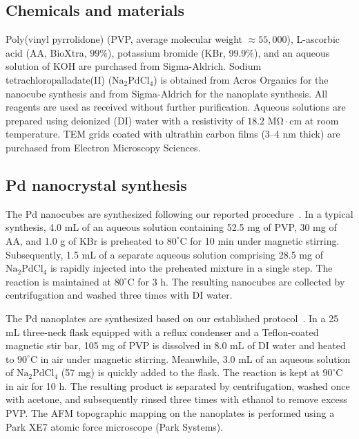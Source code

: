 \documentclass[reprint,amsmath,amssymb,aip,nofootinbib, citeautoscript,]{revtex4-2}
\begin{document}
\subsection*{Chemicals and materials}

Poly(vinyl pyrrolidone) (PVP, average molecular weight $\approx55,000$), L-ascorbic acid (AA, BioXtra, $99\%$), potassium bromide (KBr, 99.9\%), and an aqueous solution of KOH are purchased from Sigma-Aldrich. Sodium tetrachloropalladate(II) ($\mathrm{Na}_2\mathrm{PdCl}_4$) is obtained from Acros Organics for the nanocube synthesis and from Sigma-Aldrich for the nanoplate synthesis. All reagents are used as received without further purification. Aqueous solutions are prepared using deionized (DI) water with a resistivity of $18.2$  $\mathrm{M\Omega}\cdot \mathrm{cm}$ at room temperature. TEM grids coated with ultrathin carbon films (3–4 nm thick) are purchased from Electron Microscopy Sciences.


\subsection*{Pd nanocrystal synthesis}

The Pd nanocubes are synthesized following our reported procedure~\cite{jin_synthesis_2011}. In a typical synthesis, 4.0 mL of an aqueous solution containing 52.5 mg of PVP, 30 mg of AA, and 1.0 g of KBr is preheated to $80^\circ \mathrm{C}$ for 10 min under magnetic stirring. Subsequently, 1.5 mL of a separate aqueous solution comprising 28.5 mg of $\mathrm{Na}_2\mathrm{PdCl}_4$ is rapidly injected into the preheated mixture in a single step. The reaction is maintained at $80^\circ \mathrm{C}$ for 3 h. The resulting nanocubes are collected by centrifugation and washed three times with DI water.


The Pd nanoplates are synthesized based on our established protocol~\cite{xiong_polyvinyl_2006}. In a 25 mL three-neck flask equipped with a reflux condenser and a Teflon-coated magnetic stir bar, 105 mg of PVP is dissolved in 8.0 mL of DI water and heated to $90^\circ \mathrm{C}$ in air under magnetic stirring. Meanwhile, 3.0 mL of an aqueous solution of $\mathrm{Na}_2\mathrm{PdCl}_4$ (57 mg) is quickly added to the flask. The reaction is kept at  $90^\circ \mathrm{C}$ in air for 10 h. The resulting product is separated by centrifugation, washed once with acetone, and subsequently rinsed three times with ethanol to remove excess PVP. The AFM topographic mapping on the nanoplates is performed using a Park XE7 atomic force microscope (Park Systems).
\end{document}
